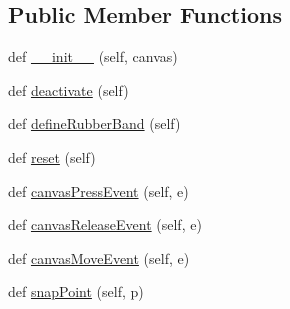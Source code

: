 \subsection*{Public Member Functions}
\begin{DoxyCompactItemize}
\item 
def \mbox{\hyperlink{class_dsg_tools_1_1_production_tools_1_1_contour_tool_1_1dsg__line__tool_1_1_dsg_line_tool_a8bff8d746bf95fb9dbe21ef083ce5cfd}{\+\_\+\+\_\+init\+\_\+\+\_\+}} (self, canvas)
\item 
def \mbox{\hyperlink{class_dsg_tools_1_1_production_tools_1_1_contour_tool_1_1dsg__line__tool_1_1_dsg_line_tool_a11ae6a2482b41c56abce97c51078db8a}{deactivate}} (self)
\item 
def \mbox{\hyperlink{class_dsg_tools_1_1_production_tools_1_1_contour_tool_1_1dsg__line__tool_1_1_dsg_line_tool_a116f16922c4a8312da82c30147964be0}{define\+Rubber\+Band}} (self)
\item 
def \mbox{\hyperlink{class_dsg_tools_1_1_production_tools_1_1_contour_tool_1_1dsg__line__tool_1_1_dsg_line_tool_a71aed4c442ef705084b8ca8193d60a24}{reset}} (self)
\item 
def \mbox{\hyperlink{class_dsg_tools_1_1_production_tools_1_1_contour_tool_1_1dsg__line__tool_1_1_dsg_line_tool_a9c7fbddb2710b258921c9fe240e11dca}{canvas\+Press\+Event}} (self, e)
\item 
def \mbox{\hyperlink{class_dsg_tools_1_1_production_tools_1_1_contour_tool_1_1dsg__line__tool_1_1_dsg_line_tool_a52180955a23d47f8ba857dac3b55e51a}{canvas\+Release\+Event}} (self, e)
\item 
def \mbox{\hyperlink{class_dsg_tools_1_1_production_tools_1_1_contour_tool_1_1dsg__line__tool_1_1_dsg_line_tool_ab00cc182b6fd3fda100a0fda14b5cf22}{canvas\+Move\+Event}} (self, e)
\item 
def \mbox{\hyperlink{class_dsg_tools_1_1_production_tools_1_1_contour_tool_1_1dsg__line__tool_1_1_dsg_line_tool_a72b2e8b035c640968acceefb07f61bc9}{snap\+Point}} (self, p)
\end{DoxyCompactItemize}
